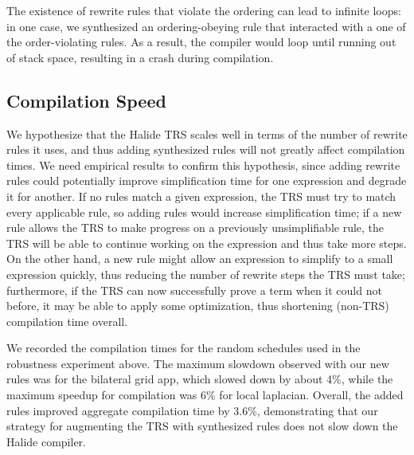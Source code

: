 \documentclass[sigplan,10pt,review,anonymous]{acmart}\settopmatter{printfolios=true,printccs=false,printacmref=false}
\newcommand{\NumOrderingProblems}{{\color{red} 46}\xspace}
\begin{document}
The existence of rewrite rules that violate the ordering can lead
to infinite loops: in one case, we synthesized an ordering-obeying rule that interacted
with a one of the order-violating rules.  As a result, the compiler
would loop until running out of stack space, resulting in a crash
during compilation.

\subsection{Compilation Speed}
\label{ssec:compilationspeed}

We hypothesize that the Halide TRS scales well in terms of the number of
rewrite rules it uses, and thus adding synthesized rules will not greatly affect
compilation times. We need empirical results to confirm this hypothesis, since
adding rewrite rules could potentially improve simplification time for one
expression and degrade it for another. If no rules match a given expression, the
TRS must try to match every applicable rule, so adding rules would
increase simplification time; if a new rule allows the TRS to make
progress on a previously unsimplifiable rule, the TRS will be able to
continue working on the expression and thus take more steps. On the other hand,
a new rule might allow an expression to simplify to a small expression quickly,
thus reducing the number of rewrite steps the TRS must take; furthermore,
if the TRS can now successfully prove a term when it could not before, it
may be able to apply some optimization, thus shortening (non-TRS)
compilation time overall.

We recorded the compilation times for the random schedules used in the robustness experiment above.
The maximum slowdown observed with our new rules was for the bilateral grid app, which slowed down
by about 4\%, while the maximum speedup for compilation was 
6\% for local laplacian.  Overall, the added rules improved aggregate compilation time by 3.6\%,
demonstrating that our strategy for augmenting the TRS with synthesized rules does
not slow down the Halide compiler.


\end{document}
